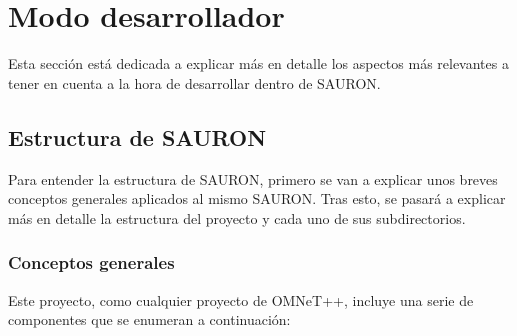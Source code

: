 \chapter{Modo desarrollador}\label{sec:cap3}
Esta sección está dedicada a explicar más en detalle los aspectos más relevantes a tener en cuenta a la hora de desarrollar dentro de SAURON.


\section{Estructura de SAURON}
Para entender la estructura de SAURON, primero se van a explicar unos breves conceptos generales aplicados al mismo SAURON. Tras esto, se pasará a explicar más en detalle la estructura del proyecto y cada uno de sus subdirectorios.

\subsection{Conceptos generales}

Este proyecto, como cualquier proyecto de OMNeT++, incluye una serie de componentes que se enumeran a continuación:

